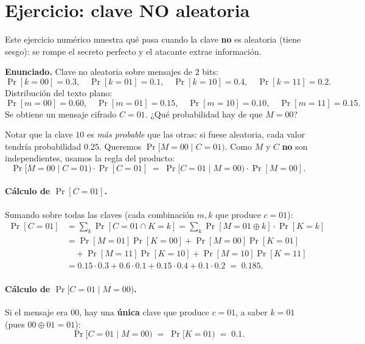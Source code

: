 \documentclass[11pt,a4paper]{article}
\newcommand{\xor}{\oplus}
\begin{document}
\section{Ejercicio: clave NO aleatoria}

Este ejercicio numérico muestra qué pasa cuando la clave \textbf{no} es aleatoria (tiene
sesgo): se rompe el secreto perfecto y el atacante extrae información.

\begin{slidebox}
\textbf{Enunciado.} Clave no aleatoria sobre mensajes de $2$ bits:
\[
  \Pr[k{=}00]=0.3,\quad \Pr[k{=}01]=0.1,\quad \Pr[k{=}10]=0.4,\quad \Pr[k{=}11]=0.2.
\]
Distribución del texto plano:
\[
  \Pr[m{=}00]=0.60,\quad \Pr[m{=}01]=0.15,\quad \Pr[m{=}10]=0.10,\quad \Pr[m{=}11]=0.15.
\]
Se obtiene un mensaje cifrado $C=01$. ¿Qué probabilidad hay de que $M=00$?
\end{slidebox}

Notar que la clave $10$ es \emph{más probable} que las otras: si fuese aleatoria, cada
valor tendría probabilidad $0.25$. Queremos $\Pr[M{=}00\mid C{=}01)$. Como $M$ y $C$
\textbf{no} son independientes, usamos la regla del producto:
\[
  \Pr[M{=}00\mid C{=}01)\cdot \Pr[C{=}01] \;=\; \Pr[C{=}01\mid M{=}00)\cdot\Pr[M{=}00].
\]

\paragraph{Cálculo de $\Pr[C{=}01]$.} Sumando sobre todas las claves (cada combinación
$m,k$ que produce $c=01$):
\[
\begin{aligned}
  \Pr[C{=}01] &= \sum_k \Pr[C{=}01\cap K{=}k] = \sum_k \Pr[M{=}01\xor k]\cdot\Pr[K{=}k]\\
  &= \Pr[M{=}01]\Pr[K{=}00] + \Pr[M{=}00]\Pr[K{=}01]\\
  &\quad + \Pr[M{=}11]\Pr[K{=}10] + \Pr[M{=}10]\Pr[K{=}11]\\
  &= 0.15\cdot0.3 + 0.6\cdot0.1 + 0.15\cdot0.4 + 0.1\cdot0.2 \;=\; \mathbf{0.185}.
\end{aligned}
\]

\paragraph{Cálculo de $\Pr[C{=}01\mid M{=}00)$.} Si el mensaje era $00$, hay una
\textbf{única} clave que produce $c=01$, a saber $k=01$ (pues $00\xor01=01$):
\[
  \Pr[C{=}01\mid M{=}00) \;=\; \Pr[K{=}01) \;=\; \mathbf{0.1}.
\]
\end{document}
